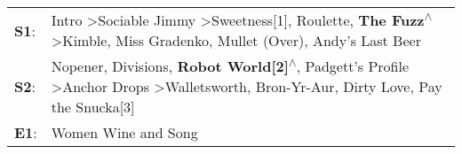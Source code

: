\begin{supertabular}{p{0.03\textwidth}p{0.92\textwidth}}
 \textbf{S1}:  &    Intro\textsuperscript{} \textgreater \enspace Sociable Jimmy\textsuperscript{} \textgreater \enspace Sweetness[1]\textsuperscript{}, \enspace Roulette\textsuperscript{}, \enspace \textbf{The Fuzz\textsuperscript{$\wedge$}} \textgreater \enspace Kimble\textsuperscript{}, \enspace Miss Gradenko\textsuperscript{}, \enspace Mullet (Over)\textsuperscript{}, \enspace Andy's Last Beer\textsuperscript{}  \enspace  \\
 \textbf{S2}:  &  Nopener\textsuperscript{}, \enspace Divisions\textsuperscript{}, \enspace \textbf{Robot World[2]\textsuperscript{$\wedge$}}, \enspace Padgett's Profile\textsuperscript{} \textgreater \enspace Anchor Drops\textsuperscript{} \textgreater \enspace Walletsworth\textsuperscript{}, \enspace Bron-Yr-Aur\textsuperscript{}, \enspace Dirty Love\textsuperscript{}, \enspace Pay the Snucka[3]\textsuperscript{}  \enspace  \\
 \textbf{E1}:  &                                                                                                                                                                                                                                                                                                                                                                             Women Wine and Song\textsuperscript{}  \enspace  \\
\end{supertabular}
